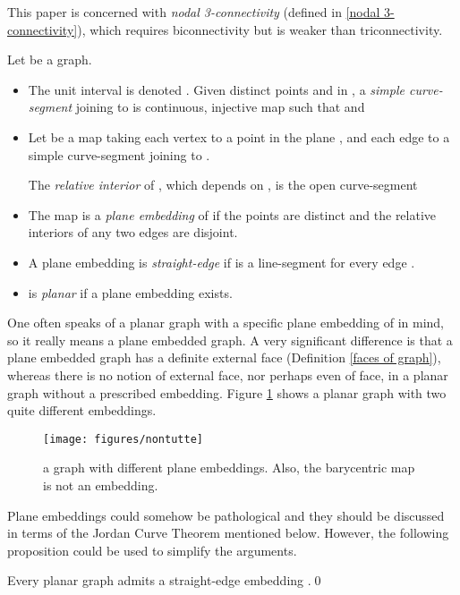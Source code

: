 This paper is concerned with {\em nodal 3-connectivity}
(defined in \ref{nodal 3-connectivity}),
which requires biconnectivity but is weaker
than triconnectivity.

\begin{definition}
\label{planar graph defined} Let  be a graph.
\begin{itemize}
\item
The unit interval 
is denoted .
Given distinct points  and  in ,
a {\em simple curve-segment} joining  to  is
continuous, injective map 
such that  and 
\item
Let  be a map taking
each vertex  to a point  in the plane ,
and each edge  to a simple curve-segment
 joining  to .

The {\em relative interior} of , which depends on ,
is the open curve-segment


\item
The map  is a {\em plane embedding} of  if the points
 are distinct and the relative interiors of any two
edges are disjoint.

\item
A plane embedding  is {\em straight-edge} if  is
a line-segment for every edge .
\item
 is {\em planar} if a plane embedding exists.
\end{itemize}
\end{definition}

One often speaks of a planar graph  with a specific
plane embedding of  in mind, so it really means a
plane embedded graph.  A very significant difference is
that a plane embedded graph has a definite external face
(Definition \ref{faces of graph}),
whereas there is no notion of external face, nor
perhaps even of face, in a planar graph without a prescribed
embedding.
Figure \ref{nontutte.fig} shows a planar graph with two
quite different embeddings.

\begin{figure}
\centerline{
\texttt{[image: figures/nontutte]}}
\caption{a graph with different plane embeddings. Also, the
barycentric map is not an embedding.}
\label{nontutte.fig}
\end{figure}

Plane embeddings could somehow be pathological
and they should be discussed in terms of
the Jordan Curve Theorem mentioned below.
However, the following proposition could be used
to simplify the arguments.

\begin{proposition}
\label{straight-edge embeddings} Every planar graph
admits a straight-edge
embedding {\rm \cite{dpp,od94,read}}.\qed
\end{proposition}

